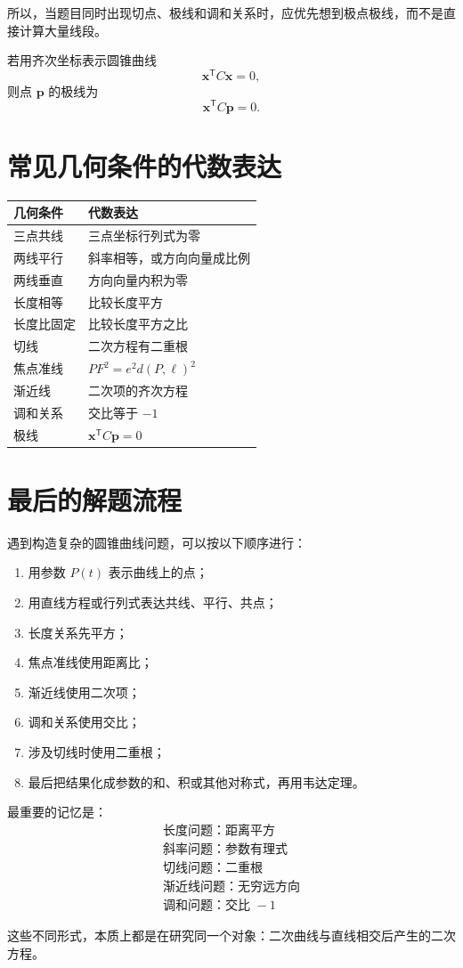\documentclass[11pt,a4paper]{ctexart}
\begin{document}
所以，当题目同时出现切点、极线和调和关系时，应优先想到极点极线，而不是直接计算大量线段。

若用齐次坐标表示圆锥曲线
\[
\mathbf{x}^{\mathsf T}C\mathbf{x}=0,
\]
则点 $\mathbf p$ 的极线为
\[
\boxed{\mathbf{x}^{\mathsf T}C\mathbf p=0}.
\]

\section{常见几何条件的代数表达}

\begin{center}
\begin{tabular}{ll}
\toprule
几何条件 & 代数表达 \\
\midrule
三点共线 & 三点坐标行列式为零 \\
两线平行 & 斜率相等，或方向向量成比例 \\
两线垂直 & 方向向量内积为零 \\
长度相等 & 比较长度平方 \\
长度比固定 & 比较长度平方之比 \\
切线 & 二次方程有二重根 \\
焦点准线 & $PF^2=e^2d(P,\ell)^2$ \\
渐近线 & 二次项的齐次方程 \\
调和关系 & 交比等于 $-1$ \\
极线 & $\mathbf{x}^{\mathsf T}C\mathbf p=0$ \\
\bottomrule
\end{tabular}
\end{center}

\section{最后的解题流程}

遇到构造复杂的圆锥曲线问题，可以按以下顺序进行：
\begin{enumerate}
  \item 用参数 $P(t)$ 表示曲线上的点；
  \item 用直线方程或行列式表达共线、平行、共点；
  \item 长度关系先平方；
  \item 焦点准线使用距离比；
  \item 渐近线使用二次项；
  \item 调和关系使用交比；
  \item 涉及切线时使用二重根；
  \item 最后把结果化成参数的和、积或其他对称式，再用韦达定理。
\end{enumerate}

最重要的记忆是：
\[
\boxed{
\begin{array}{c}
\text{长度问题：距离平方}\\[2pt]
\text{斜率问题：参数有理式}\\[2pt]
\text{切线问题：二重根}\\[2pt]
\text{渐近线问题：无穷远方向}\\[2pt]
\text{调和问题：交比 }-1
\end{array}}
\]

这些不同形式，本质上都是在研究同一个对象：二次曲线与直线相交后产生的二次方程。
\end{document}
